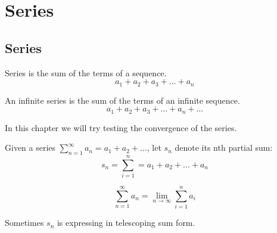 \chapter{Series}

\section{Series}

\begin{definition}[Series]
  Series is the sum of the terms of a sequence.
  \[
    a_{1} + a_{2} + a_{3} + \dots + a_{n}
  \]
\end{definition}

\begin{definition}
  An infinite series is the sum of the terms of an infinite sequence.
  \[
    a_{1} + a_{2} + a_{3} + \dots + a_{n} + \dots
  \]
\end{definition}

In this chapter we will try testing the convergence of the series.

\begin{definition}
  Given a series \(\sum_{n = 1}^{\infty} a_{n} = a_{1} + a_{2} + \dots\), let \(s_{n}\) denote its nth partial sum:
  \[
    s_{n} = \sum_{i = 1}^{n} = a_{1} + a_{2} + \dots + a_{n}
  \]
\end{definition}

\begin{lemma}
  \[
    \sum_{n = 1}^{\infty} a_{n} = \lim_{n \to \infty} \sum_{i=1}^{n} a_{i}
  \]
\end{lemma}

Sometimes $s_{n}$ is expressing in telescoping sum form.


